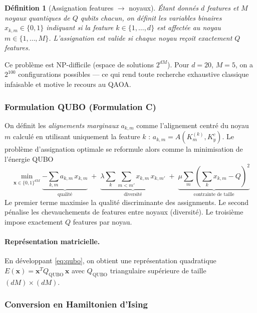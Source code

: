 \documentclass[12pt,a4paper]{article}
\newtheorem{definition}{Définition}[section]
\begin{document}
\begin{definition}[Assignation features $\to$ noyaux]
Étant donnés $d$ features et $M$ noyaux quantiques de $Q$ qubits chacun,
on définit les variables binaires $x_{k,m} \in \{0,1\}$ indiquant si la
feature $k \in \{1,\ldots,d\}$ est affectée au noyau $m \in \{1,\ldots,M\}$.
L'assignation est valide si chaque noyau reçoit exactement $Q$ features.
\end{definition}

Ce problème est NP-difficile (espace de solutions $2^{dM}$).
Pour $d=20$, $M=5$, on a $2^{100}$ configurations possibles — ce qui rend
toute recherche exhaustive classique infaisable et motive le recours au QAOA.

\subsubsection{Formulation QUBO (Formulation C)}

On définit les \emph{alignements marginaux} $a_{k,m}$ comme l'alignement
centré du noyau $m$ calculé en utilisant uniquement la feature $k$ :
$a_{k,m} = A(K_m^{(k)}, K_y^c)$.
Le problème d'assignation optimale se reformule alors comme la minimisation
de l'énergie QUBO
\begin{equation}
\boxed{
  \min_{\bm{x} \in \{0,1\}^{dM}}
  \underbrace{-\sum_{k,m} a_{k,m}\,x_{k,m}}_{\text{qualité}}
  \;+\;
  \underbrace{\lambda \sum_{k}\sum_{m < m'} x_{k,m}\,x_{k,m'}}_{\text{diversité}}
  \;+\;
  \underbrace{\mu\sum_m \!\left(\sum_k x_{k,m} - Q\right)^{\!2}}_{\text{contrainte de taille}}
}
\label{eq:qubo}
\end{equation}
Le premier terme maximise la qualité discriminante des assignments.
Le second pénalise les chevauchements de features entre noyaux (diversité).
Le troisième impose exactement $Q$ features par noyau.

\paragraph{Représentation matricielle.}
En développant \eqref{eq:qubo}, on obtient une représentation quadratique
$E(\bm{x}) = \bm{x}^T Q_{\mathrm{QUBO}}\,\bm{x}$ avec $Q_{\mathrm{QUBO}}$
triangulaire supérieure de taille $(dM)\times(dM)$.


\subsubsection{Conversion en Hamiltonien d'Ising}
\end{document}
